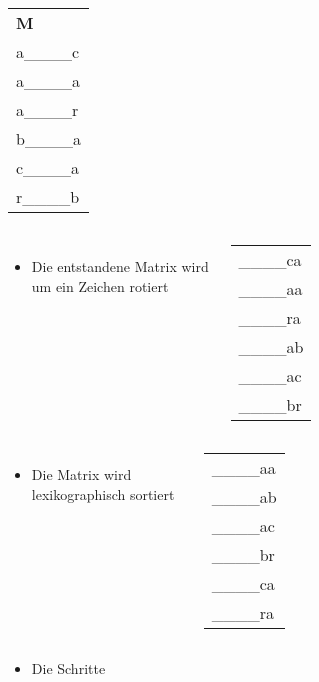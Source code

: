 \documentclass[14pt,xcolor=dvipsnames,pdftex]{beamer}
\begin{document}
\begin{frame}[allowframebreaks]
\begin{columns}[c,onlytextwidth]
    \begin{tabular}{T}
    \textbf{M} \\
    {\color{darkgreen}a}\_\_\_\_c\\
    {\color{darkgreen}a}\_\_\_\_a\\
    {\color{darkgreen}a}\_\_\_\_r\\
    {\color{darkgreen}b}\_\_\_\_a\\
    {\color{darkgreen}c}\_\_\_\_a\\
    {\color{darkgreen}r}\_\_\_\_b\\
    \end{tabular}
\end{columns}
\framebreak
\begin{columns}[c,onlytextwidth]
 \begin{itemize}
  \item Die entstandene Matrix wird um ein Zeichen rotiert
 \end{itemize}
 \begin{tabular}{T}
    \_\_\_\_c{\color{darkgreen}a}\\
    \_\_\_\_a{\color{darkgreen}a}\\
    \_\_\_\_r{\color{darkgreen}a}\\
    \_\_\_\_a{\color{darkgreen}b}\\
    \_\_\_\_a{\color{darkgreen}c}\\
    \_\_\_\_b{\color{darkgreen}r}
  \end{tabular}
\end{columns}
\framebreak
\begin{columns}[c,onlytextwidth]
 \begin{itemize}
  \item Die Matrix wird lexikographisch sortiert
 \end{itemize}
 \begin{tabular}{T}
    \_\_\_\_aa\\
    \_\_\_\_ab\\
    \_\_\_\_ac\\
    \_\_\_\_br\\
    \_\_\_\_ca\\
    \_\_\_\_ra
  \end{tabular}
\end{columns}
\framebreak
\begin{itemize}
 \item Die Schritte
 \begin{itemize}

\end{itemize}
\end{itemize}
\end{frame}
\end{document}
